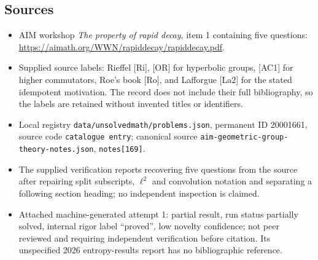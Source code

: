 \documentclass[11pt]{article}
\begin{document}
\subsection{Sources}
\begin{itemize}
\item AIM workshop \emph{The property of rapid decay}, item 1 containing five questions: \url{https://aimath.org/WWN/rapiddecay/rapiddecay.pdf}.
\item Supplied source labels: Rieffel [Ri], [OR] for hyperbolic groups, [AC1] for higher commutators, Roe's book [Ro], and Lafforgue [La2] for the stated idempotent motivation. The record does not include their full bibliography, so the labels are retained without invented titles or identifiers.
\item Local registry \texttt{data/unsolvedmath/problems.json}, permanent ID 20001661, source code \texttt{catalogue entry}; canonical source \texttt{aim-geometric-group-theory-notes.json}, \texttt{notes[169]}.
\item The supplied verification reports recovering five questions from the source after repairing split subscripts, \(\ell^2\) and convolution notation and separating a following section heading; no independent inspection is claimed.
\item Attached machine-generated attempt 1: partial result, run status partially solved, internal rigor label ``proved'', low novelty confidence; not peer reviewed and requiring independent verification before citation. Its unspecified 2026 entropy-results report has no bibliographic reference.
\end{itemize}
\end{document}
